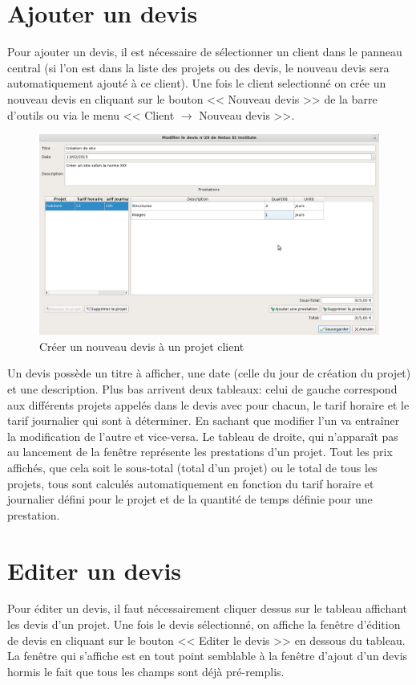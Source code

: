 \section{Ajouter un devis}
Pour ajouter un devis, il est nécessaire de sélectionner un client dans le panneau central (si l'on est dans la liste des projets ou des devis, le nouveau devis sera automatiquement ajouté à ce client). Une fois le client selectionné on crée un nouveau devis en cliquant sur le bouton << Nouveau devis >> de la barre d'outils ou via le menu << Client $\rightarrow$ Nouveau devis >>. 
\begin{figure}[H]
	\centering
	\includegraphics[width=15cm]{screens/creerDevis.png}
	\caption{Créer un nouveau devis à un projet client}
\end{figure}
Un devis possède un titre à afficher, une date (celle du jour de création du projet) et une description. Plus bas arrivent deux tableaux: celui de gauche correspond aux différents projets appelés dans le devis avec pour chacun, le tarif horaire et le tarif journalier qui sont à déterminer. En sachant que modifier l'un va entraîner la modification de l'autre et vice-versa. Le tableau de droite, qui n'apparaît pas au lancement de la fenêtre représente les prestations d'un projet. Tout les prix affichés, que cela soit le sous-total (total d'un projet) ou le total de tous les projets, tous sont calculés automatiquement en fonction du tarif horaire et journalier défini pour le projet et de la quantité de temps définie pour une prestation. 
\section{Editer un devis}
Pour éditer un devis, il faut nécessairement cliquer dessus sur le tableau affichant les devis d'un projet. Une fois le devis sélectionné, on affiche la fenêtre d'édition de devis en cliquant sur le bouton << Editer le devis >> en dessous du tableau.
La fenêtre qui s'affiche est en tout point semblable à la fenêtre d'ajout d'un devis hormis le fait que tous les champs sont déjà pré-remplis.

